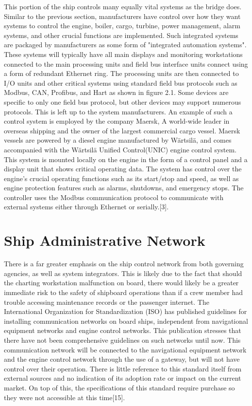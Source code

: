 \documentclass{report}
\begin{document}
This portion of the ship controls many equally vital systems as the bridge does. Similar to the previous section, manufacturers have control over how they want systems to control the engine, boiler, cargo, turbine, power management, alarm systems, and other crucial functions are implemented. Such integrated systems are packaged by manufacturers as some form of "integrated automation systems". These systems will typically have all main displays and monitoring workstations connected to the main processing units and field bus interface units connect using a form of redundant Ethernet ring. The processing units are then connected to I/O units and other critical systems using standard field bus protocols such as Modbus, CAN, Profibus, and Hart as shown in figure 2.1. Some devices are specific to only one field bus protocol, but other devices may support numerous protocols. This is left up to the system manufacturers. 
\vspace{5mm} %
An example of such a control system is employed by the company Maersk, A world-wide leader in overseas shipping and the owner of the largest commercial cargo vessel. Maersk vessels are powered by a diesel engine manufactured by Wärtsilä, and comes accompanied with the Wärtsilä Unified Control(UNIC) engine control system. This system is mounted locally on the engine in the form of a control panel and a display unit that shows critical operating data. The system has control over the engine's crucial operating functions such as its start/stop and  speed, as well as engine protection features such as alarms, shutdowns, and emergency stops. The controller uses the Modbus communication protocol to communicate with external systems either through Ethernet or serially.[3].  

\section{Ship Administrative Network}
There is a far greater emphasis on the ship control network from both governing agencies, as well as system integrators. This is likely due to the fact that should the charting workstation malfunction on board, there would likely be a greater immediate risk to the safety of shipboard operations than if a crew member had trouble accessing maintenance records or the passenger internet. 
\vspace{5mm} %
The International Organization for Standardization (ISO) has published guidelines for installing communication networks on board ships, independent from navigational equipment networks and engine control networks. This publication stresses that there have not been comprehensive guidelines on such networks until now. This communication network will be connected to the navigational equipment network and the engine control network through the use of a gateway, but will not have control over their operation. There is little reference to this standard itself from external sources and no indication of its adoption rate or impact on the current market. On top of this, the specifications of this standard require purchase so they were not accessible at this time[15].
\end{document}
